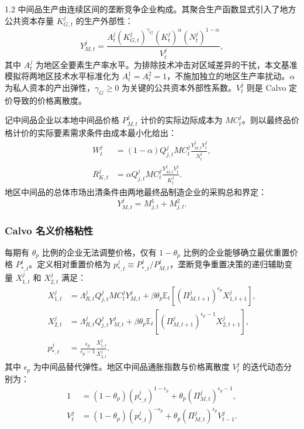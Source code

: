 \documentclass[12pt,UTF8]{ctexart}
\newcommand{\E}{\mathbb{E}}
\begin{document}
\begin{spacing}{1.2}
		中间品生产由连续区间的垄断竞争企业构成。其聚合生产函数显式引入了地方公共资本存量 $K_{G,t}^j$ 的生产外部性：
		\begin{equation}
			Y_{M,t}^j=\frac{A_t^j(K_{G,t}^j)^{\gamma_G}(K_t^j)^{\alpha}(N_t^j)^{1-\alpha}}{V_t^j},
			\label{eq:intermediate_production}
		\end{equation}
		其中 $A_t^j$ 为地区全要素生产率水平。为排除技术冲击对区域差异的干扰，本文基准模拟将两地区技术水平标准化为 $A_t^1=A_t^2=1$，不施加独立的地区生产率扰动。$\alpha$ 为私人资本的产出弹性，$\gamma_G \ge 0$ 为关键的公共资本外部性系数。$V_t^j$ 则是 Calvo 定价导致的价格离散度。
		
		记中间品企业以本地中间品价格 $P_{M,t}^j$ 计价的实际边际成本为 $MC_t^j$。则以最终品价格计价的实际要素需求条件由成本最小化给出：
		\begin{align}
			W_t^j &=(1-\alpha)Q_{j,t}^jMC_t^j\frac{Y_{M,t}^jV_t^j}{N_t^j}, \label{eq:wage_demand}\\
			R_{K,t}^j &=\alpha Q_{j,t}^jMC_t^j\frac{Y_{M,t}^jV_t^j}{K_t^j}.
			\label{eq:rk_demand}
		\end{align}
		地区中间品的总体市场出清条件由两地最终品制造企业的采购总和界定：
		\begin{equation}
			Y_{M,t}^j=M_{j,t}^1+M_{j,t}^2.
			\label{eq:intermediate_clearing}
		\end{equation}
		
		\subsubsection{Calvo 名义价格粘性}
		
		每期有 $\theta_p$ 比例的企业无法调整价格，仅有 $1-\theta_p$ 比例的企业能够确立最优重置价格 $P_{*,t}^j$。定义相对重置价格为 $p_{*,t}^j \equiv P_{*,t}^j / P_{M,t}^j$，垄断竞争重置决策的递归辅助变量 $X_{1,t}^j$ 和 $X_{2,t}^j$ 满足：
		\begin{align}
			X_{1,t}^j &=\Lambda_{R,t}^jQ_{j,t}^jMC_t^jY_{M,t}^j
			+\beta\theta_p\E_t\left[(\Pi_{M,t+1}^j)^{\epsilon_p}X_{1,t+1}^j\right], \label{eq:x1}\\
			X_{2,t}^j &=\Lambda_{R,t}^jQ_{j,t}^jY_{M,t}^j
			+\beta\theta_p\E_t\left[(\Pi_{M,t+1}^j)^{\epsilon_p-1}X_{2,t+1}^j\right], \label{eq:x2}\\
			p_{*,t}^j &=\frac{\epsilon_p}{\epsilon_p-1}\frac{X_{1,t}^j}{X_{2,t}^j}.
			\label{eq:pstar}
		\end{align}
		其中 $\epsilon_p$ 为中间品替代弹性。地区中间品通胀指数与价格离散度 $V_t^j$ 的迭代动态分别为：
		\begin{align}
			1 &=(1-\theta_p)(p_{*,t}^j)^{1-\epsilon_p} +\theta_p(\Pi_{M,t}^j)^{\epsilon_p-1}, \label{eq:calvo_index}\\
			V_t^j &=(1-\theta_p)(p_{*,t}^j)^{-\epsilon_p} +\theta_p(\Pi_{M,t}^j)^{\epsilon_p}V_{t-1}^j.
			\label{eq:dispersion}
		\end{align}
		

\end{spacing}
\end{document}
